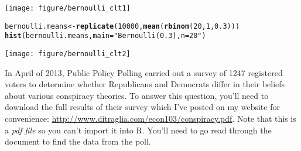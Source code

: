 \documentclass[addpoints,12pt]{exam}\usepackage[]{graphicx}\usepackage[]{color}
\makeatletter
\def\maxwidth{ %
  \ifdim\Gin@nat@width>\linewidth
    \linewidth
  \else
    \Gin@nat@width
  \fi
}
\newcommand{\hlnum}[1]{\textcolor[rgb]{0.686,0.059,0.569}{#1}}%
\newcommand{\hlstr}[1]{\textcolor[rgb]{0.192,0.494,0.8}{#1}}%
\newcommand{\hlopt}[1]{\textcolor[rgb]{0,0,0}{#1}}%
\newcommand{\hlstd}[1]{\textcolor[rgb]{0.345,0.345,0.345}{#1}}%
\newcommand{\hlkwb}[1]{\textcolor[rgb]{0.69,0.353,0.396}{#1}}%
\newcommand{\hlkwc}[1]{\textcolor[rgb]{0.333,0.667,0.333}{#1}}%
\newcommand{\hlkwd}[1]{\textcolor[rgb]{0.737,0.353,0.396}{\textbf{#1}}}%
\newenvironment{kframe}{%
 \def\at@end@of@kframe{}%
 \ifinner\ifhmode%
  \def\at@end@of@kframe{\end{minipage}}%
  \begin{minipage}{\columnwidth}%
 \fi\fi%
 \def\FrameCommand##1{\hskip\@totalleftmargin \hskip-\fboxsep
 \colorbox{shadecolor}{##1}\hskip-\fboxsep
     \hskip-\linewidth \hskip-\@totalleftmargin \hskip\columnwidth}%
 \MakeFramed {\advance\hsize-\width
   \@totalleftmargin\z@ \linewidth\hsize
   \@setminipage}}%
 {\par\unskip\endMakeFramed%
 \at@end@of@kframe}
\newenvironment{knitrout}{}{} %
\makeatother
\begin{document}
\begin{questions}
\begin{solution}
\begin{knitrout}
{\centering \texttt{[image: figure/bernoulli\_clt1]} 

}


\begin{kframe}\begin{alltt}
\hlstd{bernoulli.means} \hlkwb{<-} \hlkwd{replicate}\hlstd{(}\hlnum{10000}\hlstd{,} \hlkwd{mean}\hlstd{(}\hlkwd{rbinom}\hlstd{(}\hlnum{20}\hlstd{,} \hlnum{1}\hlstd{,} \hlnum{0.3}\hlstd{)))}
\hlkwd{hist}\hlstd{(bernoulli.means,} \hlkwc{main} \hlstd{=} \hlstr{"Bernoulli(0.3), n = 20"}\hlstd{)}
\end{alltt}
\end{kframe}

{\centering \texttt{[image: figure/bernoulli\_clt2]} 

}



\end{knitrout}
	\end{solution}

\question In April of 2013, Public Policy Polling carried out a survey of 1247 registered voters to determine whether Republicans and Democrats differ in their beliefs about various conspiracy theories. To answer this question, you'll need to download the full results of their survey which I've posted on my website for convenience:
\url{http://www.ditraglia.com/econ103/conspiracy.pdf}. Note that this is a \emph{pdf file} so you can't import it into R. You'll need to go read through the document to find the data from the poll.
\end{questions}
\end{document}
